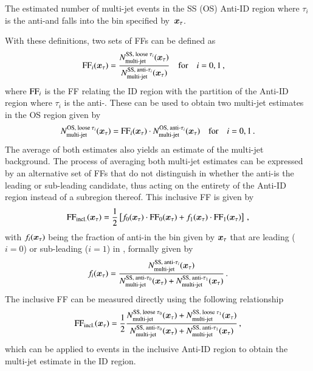 {\begin{description}[style=standard]
  \item[$\NmjAntiID{SS(OS)}{i}\ffargs$] The estimated number of multi-jet events
    in the SS (OS) Anti-ID region where $\tau_i$ is the anti-\tauhadvis and
    falls into the bin specified by~$\bm{x}_\tau$.
  \end{description}
  With these definitions, two sets of FFs can be defined as
  \begin{align*}
    \text{FF}_{i}( \bm{x}_{\tau} ) &= \frac{N_\text{multi-jet}^{\text{SS, loose }\tau_{i}} ( \bm{x}_{\tau} )}{N_\text{multi-jet}^{\text{SS, anti-}\tau_{i}}( \bm{x}_{\tau} )}
                     \quad \text{for} \quad i = 0, 1 \,\text{,}
  \end{align*}
  where $\text{FF}_{i}$ is the FF relating the ID region with the partition of the
  Anti-ID region where $\tau_i$ is the anti-\tauhadvis. These can be used to
  obtain two multi-jet estimates in the OS region given by
  \begin{align*}
    N_\text{multi-jet}^{\text{OS, loose }\tau_{i}}( \bm{x}_{\tau} ) = \text{FF}_{i}( \bm{x}_{\tau} ) \cdot N_\text{multi-jet}^{\text{OS, anti-}\tau_{i}}( \bm{x}_{\tau} )
    \quad \text{for} \quad i = 0, 1 \,\text{.}
  \end{align*}
  The average of both estimates also yields an estimate of the multi-jet
  background. The process of averaging both multi-jet estimates can be expressed
  by an alternative set of FFs that do not distinguish in whether the
  anti-\tauhadvis is the leading or sub-leading \tauhadvis candidate, thus
  acting on the entirety of the Anti-ID region instead of a subregion
  thereof. This inclusive FF is given by
  \begin{align*}
    \text{FF}_\text{incl.}( \bm{x}_{\tau} ) = \frac{1}{2} \left[ f_0( \bm{x}_{\tau} ) \cdot \text{FF}_0( \bm{x}_{\tau} )
    + f_1( \bm{x}_{\tau} ) \cdot \text{FF}_1( \bm{x}_{\tau} ) \right] \,\text{,}
  \end{align*}
  with $f_i( \bm{x}_{\tau} )$ being the fraction of anti-\tauhadvis in the bin given by
  $\bm{x}_\tau$ that are leading ($i = 0$) or sub-leading ($i = 1$) in \pT,
  formally given by
  \begin{align*}
    f_i( \bm{x}_{\tau} ) = \frac{N_\text{multi-jet}^{\text{SS, anti-}\tau_{i}}( \bm{x}_{\tau} )}
                      {N_\text{multi-jet}^{\text{SS, anti-}\tau_{0}}( \bm{x}_{\tau} ) + N_\text{multi-jet}^{\text{SS, anti-}\tau_{1}}( \bm{x}_{\tau} )} \,\text{.}
  \end{align*}
  The inclusive FF can be measured directly using the following relationship
  \begin{align}
    \text{FF}_\text{incl.}( \bm{x}_{\tau} )
    = \frac{1}{2} \frac{ N_\text{multi-jet}^{\text{SS, loose }\tau_{0}}( \bm{x}_{\tau} ) + N_\text{multi-jet}^{\text{SS, loose }\tau_{1}}( \bm{x}_{\tau} ) }
                       { N_\text{multi-jet}^{\text{SS, anti-}\tau_{0}}( \bm{x}_{\tau} ) + N_\text{multi-jet}^{\text{SS, anti-}\tau_{1}}( \bm{x}_{\tau} ) } \,\text{,}
    \label{eq:inclusive_fake_factor}
  \end{align}
  which can be applied to events in the inclusive Anti-ID region to obtain the
  multi-jet estimate in the ID region.

}
